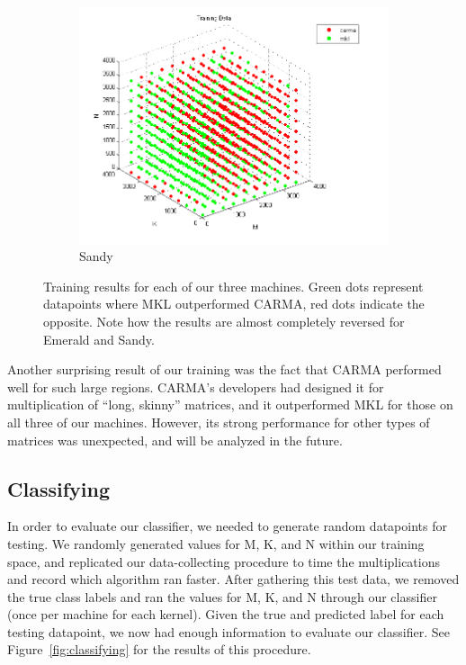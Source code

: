 \begin{figure}[t]
        \begin{subfigure}[t]{0.33\textwidth}
            \includegraphics[width=\textwidth]{figures/sandy_train.png}
            \caption{Sandy}
            \label{f:train_sandy}
        \end{subfigure}
        \caption{Training results for each of our three machines. Green dots represent datapoints where MKL outperformed CARMA, red dots indicate the opposite. Note how the results are almost completely reversed for Emerald and Sandy.}
    \label{fig:training}
\end{figure}

Another surprising result of our training was the fact that CARMA performed well for such large regions.
CARMA's developers had designed it for multiplication of ``long, skinny'' matrices, and it outperformed MKL for those on all three of our machines.
However, its strong performance for other types of matrices was unexpected, and will be analyzed in the future.

\subsection{Classifying}
In order to evaluate our classifier, we needed to generate random datapoints for testing.
We randomly generated values for M, K, and N within our training space, and replicated our data-collecting procedure to time the multiplications and record which algorithm ran faster.
After gathering this test data, we removed the true class labels and ran the values for M, K, and N through our classifier (once per machine for each kernel).
Given the true and predicted label for each testing datapoint, we now had enough information to evaluate our classifier.
See Figure~\ref{fig:classifying} for the results of this procedure.

